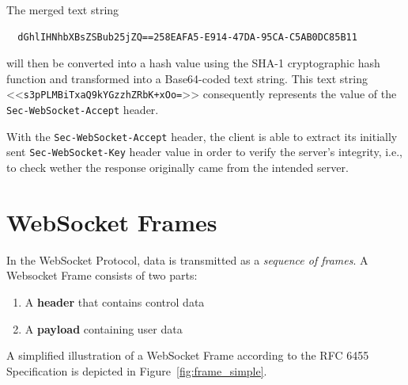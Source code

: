 \documentclass[a4paper, justified, notoc]{tufte-handout} %
\begin{document}
The merged text string 
\begin{Verbatim}
  dGhlIHNhbXBsZSBub25jZQ==258EAFA5-E914-47DA-95CA-C5AB0DC85B11
\end{Verbatim}
will then be converted into a hash value using the SHA-1 cryptographic hash function and transformed into a Base64-coded text string. This text string <<\texttt{s3pPLMBiTxaQ9kYGzzhZRbK+xOo=}>> consequently represents the value of the \texttt{Sec-WebSocket-Accept} header.

With the \texttt{Sec-WebSocket-Accept} header, the client is able to extract its initially sent \texttt{Sec-WebSocket-Key} header value in order to verify the server's integrity, i.e., to check wether the response originally came from the intended server.



\section{WebSocket Frames} %
\label{sec:the_dataframe}

In the WebSocket Protocol, data is transmitted as a \emph{sequence of frames}. A Websocket Frame consists of two parts:
\begin{enumerate}
	\item A \textbf{header} that contains control data
	\item A \textbf{payload} containing user data
\end{enumerate}
A simplified illustration of a WebSocket Frame according to the RFC 6455 Specification is depicted in Figure~\ref{fig:frame_simple}.
\end{document}
